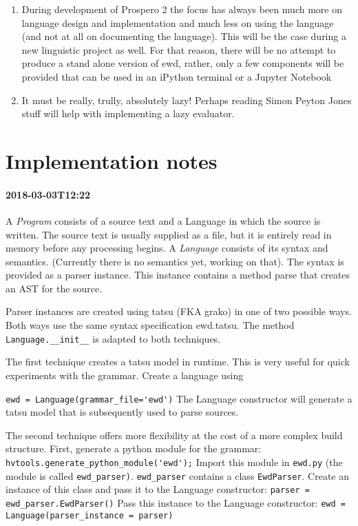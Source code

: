 \documentclass[11pt, a4paper]{article}
\begin{document}
\begin{enumerate}
\item During development of Prospero 2 the focus has always been much more on language 
design and implementation and much less on using the language (and not at all on 
documenting the language). This will be the case during a new linguistic project as well. For that reason, there will be no attempt to produce a stand alone version of ewd, rather, only a few components will be provided that can be used in an iPython terminal or a Jupyter Notebook

\item It must be really, trully, absolutely lazy! Perhaps reading Simon Peyton Jones 
stuff will help with implementing a lazy evaluator.

\end{enumerate}

\section{Implementation notes}

\paragraph{2018-03-03T12:22}

A \emph{Program} consists of a source text and a Language in which the source is written. 
The source text is usually supplied as a file, but it is entirely read in memory before any processing begins.
A \emph{Language} consists of its syntax and semantics. (Currently there is no semantics yet, working on that). 
The syntax is provided as a parser instance.
This instance contains a method parse that creates an AST for the source.

Parser instances are created using tatsu (FKA grako) in one of two possible ways. 
Both ways use the same syntax specification ewd.tatsu. 
The method \verb|Language.__init__| is adapted to both techniques.

The first technique creates a tatsu model in runtime. 
This is very useful for quick experiments with the grammar. 
Create a language using

\verb|ewd = Language(grammar_file='ewd')|
The Language constructor will generate a tatsu model that is subsequently used to parse sources.

The second technique offers more flexibility at the cost of a more complex build structure.
First, generate a python module for the grammar:\\
\verb|hvtools.generate_python_module('ewd');|
Import this module in \verb|ewd.py| (the module is called \verb|ewd_parser)|. 
\verb|ewd_parser| contains a class \verb|EwdParser|. 
Create an instance of this class and pass it to the Language constructor:
\verb|parser = ewd_parser.EwdParser()|
Pass this instance to the Language constructor:
\verb|ewd = Language(parser_instance = parser)|
\end{document}

